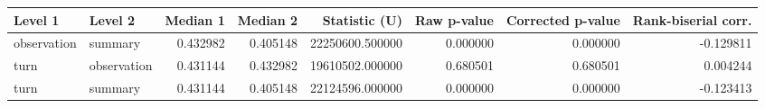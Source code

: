\begin{tabular}{llrrrrrr}
\toprule
Level 1 & Level 2 & Median 1 & Median 2 & Statistic (U) & Raw p-value & Corrected p-value & Rank-biserial corr. \\
\midrule
observation & summary & 0.432982 & 0.405148 & 22250600.500000 & 0.000000 & 0.000000 & -0.129811 \\
turn & observation & 0.431144 & 0.432982 & 19610502.000000 & 0.680501 & 0.680501 & 0.004244 \\
turn & summary & 0.431144 & 0.405148 & 22124596.000000 & 0.000000 & 0.000000 & -0.123413 \\
\bottomrule
\end{tabular}
